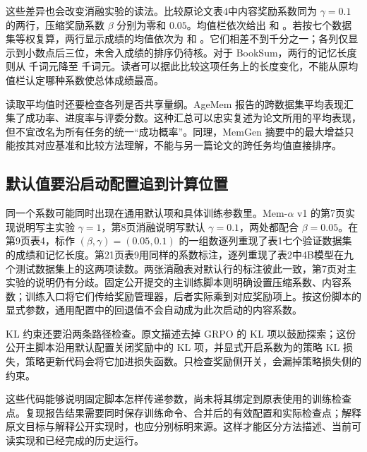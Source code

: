 这些差异也会改变消融实验的读法。比较原论文表4中内容奖励系数同为 $\gamma=0.1$ 的两行，压缩奖励系数 $\beta$ 分别为零和 $0.05$。均值栏依次给出  和 。若按七个数据集等权复算，两行显示成绩的均值依次为  和 。它们相差不到千分之一；各列仅显示到小数点后三位，未舍入成绩的排序仍待核。对于 BookSum，两行的记忆长度则从  千词元降至  千词元。读者可以据此比较这项任务上的长度变化，不能从原均值栏认定哪种系数使总体成绩最高\cite{memalpha-2509}。

读取平均值时还要检查各列是否共享量纲。AgeMem 报告的跨数据集平均表现汇集了成功率、进度率与评委分数\cite{agemem-2601}。这种汇总可以忠实复述为论文所用的平均表现，但不宜改名为所有任务的统一“成功概率”。同理，MemGen 摘要中的最大增益只能按其对应基准和比较方法理解，不能与另一篇论文的跨任务均值直接排序。

\subsection{默认值要沿启动配置追到计算位置}
\label{sec:ch06-config-identity}

同一个系数可能同时出现在通用默认项和具体训练参数里。Mem-$\alpha$ v1 的第7页实现说明写主实验 $\gamma=1$，第8页消融说明写默认 $\gamma=0.1$，两处都配合 $\beta=0.05$\cite{memalpha-2509}。在第9页表4，标作 $(\beta,\gamma)=(0.05,0.1)$ 的一组数逐列重现了表1七个验证数据集的成绩和记忆长度。第21页表9用同样的系数标注，逐列重现了表2中4B模型在九个测试数据集上的这两项读数\cite{memalpha-2509}。两张消融表对默认行的标注彼此一致，第7页对主实验的说明仍有分歧。固定公开提交的主训练脚本则明确设置压缩系数、内容系数；训练入口将它们传给奖励管理器，后者实际乘到对应奖励项上\cite{memalpha-code-2025}。按这份脚本的显式参数，通用配置中的回退值不会自动成为此次启动的内容系数。

KL 约束还要沿两条路径检查。原文描述去掉 GRPO 的 KL 项以鼓励探索\cite{memalpha-2509}；这份公开主脚本沿用默认配置关闭奖励中的 KL 项，并显式开启系数为的策略 KL 损失，策略更新代码会将它加进损失函数\cite{memalpha-code-2025}。只检查奖励侧开关，会漏掉策略损失侧的约束。

这些代码能够说明固定脚本怎样传递参数，尚未将其绑定到原表使用的训练检查点。复现报告结果需要同时保存训练命令、合并后的有效配置和实际检查点；解释原文目标与解释公开实现时，也应分别标明来源。这样才能区分方法描述、当前可读实现和已经完成的历史运行。


